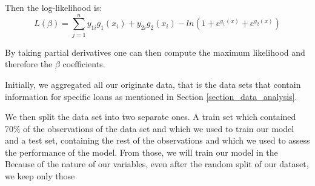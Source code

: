     Then the log-likelihood is:
    \begin{equation}
        L(\beta) = \sum_{j=1}^{n} y_{1i}g_1(x_i) + y_{2i}g_2(x_i) - ln(1 + e^{g_1(x)} + e^{g_2(x)})
    \end{equation}
    
    By taking partial derivatives one can then compute the maximum likelihood and therefore the $\beta$ coefficients. 
    
    

    Initially, we aggregated all our originate data, that is the data 
    sets that contain information for specific loans as mentioned in 
    Section \ref{section_data_analysis}.

    We then split the data set into two separate ones. A train set 
    which contained 70\% of the observations of the data set and which 
    we used to train our model and a test set, containing the rest of 
    the observations and which we used to assess the performance of the 
    model.
    From those, we will train our model in the 
    Because of the nature of our variables, even after the random split of our dataset, we keep only those 



